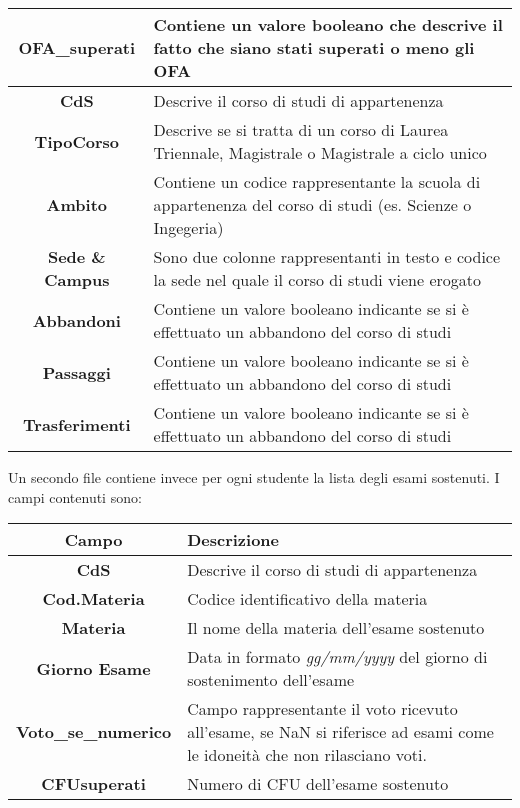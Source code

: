 \documentclass[../Report.tex]{subfiles}
\begin{document}
\begin{longtable}{|c|p{10cm}|}
                \hline
                \bfseries{OFA\_superati} & Contiene un valore booleano che descrive il fatto che siano stati superati o meno gli OFA \\
                \hline 
                \bfseries{CdS} & Descrive il corso di studi di appartenenza \\
                \hline 
                \bfseries{ TipoCorso} & Descrive se si tratta di un corso di Laurea Triennale, Magistrale o Magistrale a ciclo unico \\
                \hline
                \bfseries{ Ambito} & Contiene un codice rappresentante la scuola di appartenenza del corso di studi (es. Scienze o Ingegeria) \\ 
                \hline
                \bfseries{ Sede \& Campus} & Sono due colonne rappresentanti in testo e codice la sede nel quale il corso di studi viene erogato \\
                \hline
                \bfseries{Abbandoni} & Contiene un valore booleano indicante se si è effettuato un abbandono del corso di studi \\
                \hline 
                \bfseries{Passaggi} & Contiene un valore booleano indicante se si è effettuato un abbandono del corso di studi \\
                \hline 
                \bfseries{Trasferimenti} & Contiene un valore booleano indicante se si è effettuato un abbandono del corso di studi \\
                \hline 
        \end{longtable}
        Un secondo file contiene invece per ogni studente la lista degli esami sostenuti. I campi contenuti sono:
            \begin{table}[H]
                \begin{tabular}{|c|p{10cm}|}
                    \hline
                    \textbf{Campo} & \textbf{Descrizione} \\
                    \hline
                    \textbf{CdS} & Descrive il corso di studi di appartenenza \\
                    \hline
                    \textbf{Cod.Materia} & Codice identificativo della materia \\
                    \hline
                    \textbf{Materia} & Il nome della materia dell'esame sostenuto \\
                    \hline
                    \textbf{Giorno Esame} & Data in formato \emph{gg/mm/yyyy} del giorno di sostenimento dell'esame \\
                    \hline
                    \textbf{Voto\_se\_numerico} & Campo rappresentante il voto ricevuto all'esame, se NaN si riferisce ad esami come le idoneità che non rilasciano voti. \\
                    \hline
            \textbf{CFUsuperati} & Numero di CFU dell'esame sostenuto \\
            \hline
        \end{tabular}
        \centering
    \end{table}
\end{document}

